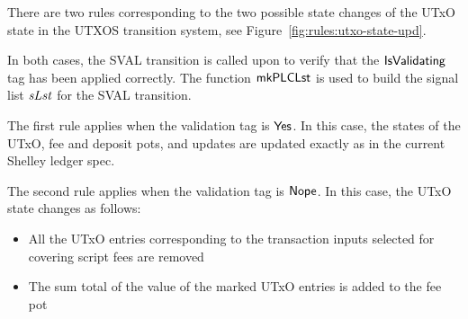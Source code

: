 There are two rules corresponding to the two possible state changes of the
UTxO state in the UTXOS transition system, see Figure~\ref{fig:rules:utxo-state-upd}.

In both cases, the SVAL transition is called upon to verify that the $\mathsf{IsValidating}$
tag has been applied correctly. The function $\mathsf{mkPLCLst}$ is used to build
the signal list $\mathit{sLst}$ for the SVAL transition.

The first rule
applies when the validation tag is $\mathsf{Yes}$.
In this case, the states of the UTxO, fee
  and deposit pots, and updates are updated exactly as in the current Shelley
  ledger spec.

  The second rule
  applies when the validation tag is $\mathsf{Nope}$.
  In this case, the UTxO state changes as follows:

  \begin{itemize}
    \item All the
    UTxO entries corresponding to the transaction inputs selected for covering
    script fees are removed

    \item The sum total of the value of the marked UTxO entries
    is added to the fee pot
  \end{itemize}


